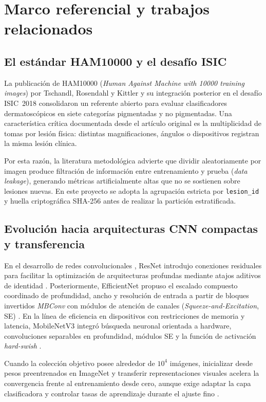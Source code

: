 \FloatBarrier\section{Marco referencial y trabajos relacionados}

\subsection{El estándar HAM10000 y el desafío ISIC}
La publicación de HAM10000 (\textit{Human Against Machine with 10000 training images}) por Tschandl, Rosendahl y Kittler \cite{tschandl2018} y su integración posterior en el desafío ISIC~2018 \cite{codella2019} consolidaron un referente abierto para evaluar clasificadores dermatoscópicos en siete categorías pigmentadas y no pigmentadas. Una característica crítica documentada desde el artículo original es la multiplicidad de tomas por lesión física: distintas magnificaciones, ángulos o dispositivos registran la misma lesión clínica.

Por esta razón, la literatura metodológica advierte que dividir aleatoriamente por imagen produce filtración de información entre entrenamiento y prueba (\textit{data leakage}), generando métricas artificialmente altas que no se sostienen sobre lesiones nuevas. En este proyecto se adopta la agrupación estricta por \texttt{lesion\_id} y huella criptográfica SHA-256 antes de realizar la partición estratificada.

\subsection{Evolución hacia arquitecturas CNN compactas y transferencia}
En el desarrollo de redes convolucionales \cite{goodfellow2016}, ResNet introdujo conexiones residuales para facilitar la optimización de arquitecturas profundas mediante atajos aditivos de identidad \cite{he2016}. Posteriormente, EfficientNet propuso el escalado compuesto coordinado de profundidad, ancho y resolución de entrada a partir de bloques invertidos \textit{MBConv} con módulos de atención de canales (\textit{Squeeze-and-Excitation}, SE) \cite{tan2019}. En la línea de eficiencia en dispositivos con restricciones de memoria y latencia, MobileNetV3 integró búsqueda neuronal orientada a hardware, convoluciones separables en profundidad, módulos SE y la función de activación \textit{hard-swish} \cite{howard2019}.

Cuando la colección objetivo posee alrededor de $10^4$ imágenes, inicializar desde pesos preentrenados en ImageNet y transferir representaciones visuales acelera la convergencia frente al entrenamiento desde cero, aunque exige adaptar la capa clasificadora y controlar tasas de aprendizaje durante el ajuste fino \cite{pan2010}.


